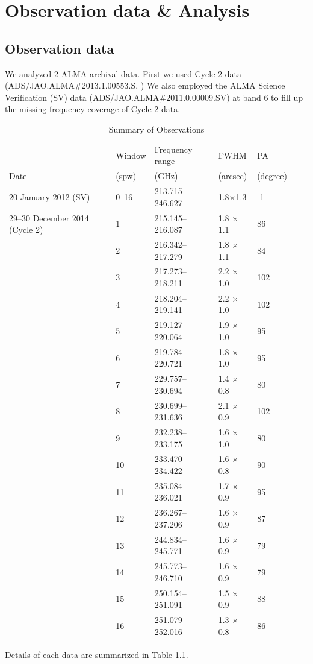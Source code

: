 \chapter{Observation data \& Analysis
\label{chap:Orion-KL}}
\section{Observation data}
We analyzed 2 ALMA archival data. First we used Cycle 2 data (ADS/JAO.ALMA\#2013.1.00553.S, 
\cite{Pagani+2017}) 
We also employed the ALMA Science Verification (SV) data (ADS/JAO.ALMA\#2011.0.00009.SV) 
at band 6 to fill up the missing frequency coverage of Cycle 2 data. 
\renewcommand{\arraystretch}{1.5}
\begin{table}[htb]
\begin{center}
  \caption{Summary of Observations}
  \label{tab:Obs_Ori}
{\scriptsize
  \begin{tabular}{lllllll} \hline \hline
 & Window & Frequency range & FWHM & PA \\
Date & (spw)  & (GHz) & (arcsec) & (degree) \\ \hline 
20 January 2012 (SV) & 0--16 & 213.715--246.627& 1.8$\times$1.3 & -1  \\  \hline
29--30 December 2014 (Cycle 2)&1 & 215.145--216.087 & 1.8 $\times$1.1 & 86 \\
&2 & 216.342--217.279 & 1.8 $\times$1.1 & 84 \\
&3 & 217.273--218.211 & 2.2 $\times$1.0 & 102 \\
&4 & 218.204--219.141 & 2.2 $\times$1.0 & 102 \\
&5 & 219.127--220.064 & 1.9 $\times$1.0 & 95 \\
&6 & 219.784--220.721 & 1.8 $\times$1.0  & 95 \\
&7 & 229.757--230.694 & 1.4 $\times$0.8 & 80 \\
&8 & 230.699--231.636 & 2.1 $\times$0.9 & 102 \\
&9 & 232.238--233.175 & 1.6 $\times$1.0 & 80 \\
&10 & 233.470--234.422 & 1.6 $\times$0.8 & 90 \\
&11 & 235.084--236.021 & 1.7 $\times$0.9 & 95 \\
&12 & 236.267--237.206 & 1.6 $\times$0.9 & 87 \\
&13 & 244.834--245.771 & 1.6 $\times$0.9 & 79 \\
&14 & 245.773--246.710 & 1.6 $\times$0.9 & 79 \\
&15 & 250.154--251.091 & 1.5 $\times$0.9 & 88 \\
&16 & 251.079--252.016 & 1.3 $\times$0.8 & 86 \\ \hline
  \end{tabular}
  }
\end{center}
\end{table}
Details of each data are summarized in Table \ref{tab:Obs_Ori}.

